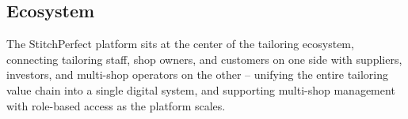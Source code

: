 \documentclass[11pt]{article}
\begin{document}
\subsection{Ecosystem}
The StitchPerfect platform sits at the center of the tailoring ecosystem, connecting tailoring
staff, shop owners, and customers on one side with suppliers, investors, and multi-shop operators
on the other -- unifying the entire tailoring value chain into a single digital system, and
supporting multi-shop management with role-based access as the platform scales.
\end{document}
